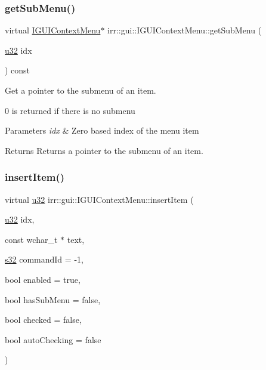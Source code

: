 \subsubsection{\texorpdfstring{get\+Sub\+Menu()}{getSubMenu()}}
{\footnotesize\ttfamily virtual \hyperlink{classirr_1_1gui_1_1IGUIContextMenu}{I\+G\+U\+I\+Context\+Menu}$\ast$ irr\+::gui\+::\+I\+G\+U\+I\+Context\+Menu\+::get\+Sub\+Menu (\begin{DoxyParamCaption}\item[{\hyperlink{namespaceirr_a0416a53257075833e7002efd0a18e804}{u32}}]{idx }\end{DoxyParamCaption}) const\hspace{0.3cm}{\ttfamily [pure virtual]}}



Get a pointer to the submenu of an item. 

0 is returned if there is no submenu 
\begin{DoxyParams}{Parameters}
{\em idx} & Zero based index of the menu item \\
\hline
\end{DoxyParams}
\begin{DoxyReturn}{Returns}
Returns a pointer to the submenu of an item. 
\end{DoxyReturn}
\mbox{\label{classirr_1_1gui_1_1IGUIContextMenu_ad4695f88c63ffc09690c5ff682c3aabc}} 
\subsubsection{\texorpdfstring{insert\+Item()}{insertItem()}}
{\footnotesize\ttfamily virtual \hyperlink{namespaceirr_a0416a53257075833e7002efd0a18e804}{u32} irr\+::gui\+::\+I\+G\+U\+I\+Context\+Menu\+::insert\+Item (\begin{DoxyParamCaption}\item[{\hyperlink{namespaceirr_a0416a53257075833e7002efd0a18e804}{u32}}]{idx,  }\item[{const wchar\+\_\+t $\ast$}]{text,  }\item[{\hyperlink{namespaceirr_ac66849b7a6ed16e30ebede579f9b47c6}{s32}}]{command\+Id = {\ttfamily -\/1},  }\item[{bool}]{enabled = {\ttfamily true},  }\item[{bool}]{has\+Sub\+Menu = {\ttfamily false},  }\item[{bool}]{checked = {\ttfamily false},  }\item[{bool}]{auto\+Checking = {\ttfamily false} }\end{DoxyParamCaption})\hspace{0.3cm}{\ttfamily [pure virtual]}}



